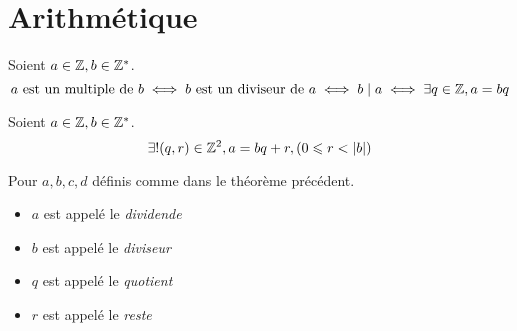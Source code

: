 \chapter{Arithmétique}
\begin{definition}
    Soient $a \in \mathbb{Z}, b \in \mathbb{Z}^*$.
    \[ a \text{ est un multiple de } b \iff b \text{ est un diviseur de } a \iff b \mid a \iff \exists q \in \mathbb{Z}, a = bq \]
\end{definition}

\begin{theorem}
    Soient $a \in \mathbb{Z}, b \in \mathbb{Z}^*$.
    \[ \exists ! (q, r) \in \mathbb{Z}^2, a = bq + r, (0 \leqslant r < \abs{b}) \]
\end{theorem}

\begin{nomenclature}
    Pour $a, b, c, d$ définis comme dans le théorème précédent.
    \begin{multicols}{2}
        \begin{itemize}
        \item $a$ est appelé le \emph{dividende}
        \item $b$ est appelé le \emph{diviseur}
        \item $q$ est appelé le \emph{quotient}
        \item $r$ est appelé le \emph{reste}
    \end{itemize}
    \end{multicols}
\end{nomenclature}

